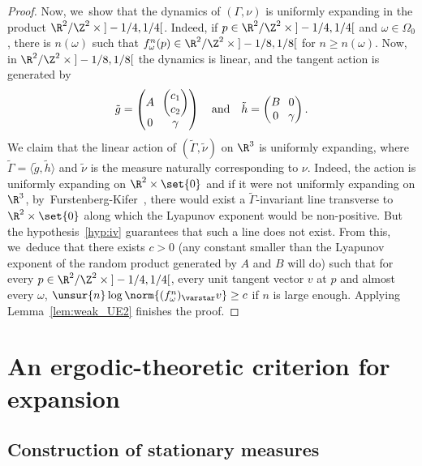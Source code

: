 \begin{proof}
Now, we~show that the dynamics of $(\Gamma, \nu)$ is uniformly expanding in the product
$\R^2/\Z^2 \times{}]-1/4, 1/4[$. Indeed, if $p\in \R^2/\Z^2 \times{}]-1/4, 1/4[$ and $\omega\in \Omega_0$, there
is $n(\omega)$ such that $f^n_\omega(p)\in \R^2/\Z^2 \times{}]-1/8, 1/8[$ for $n\geq n(\omega)$.
Now, in $\R^2/\Z^2 \times{}]-1/8, 1/8[$ the dynamics is linear, and the tangent action is generated by
\begin{equation*}\arraycolsep3.5pt
\tilde g = \begin{pmatrix}A & \begin{pmatrix} c_1 \\ c_2 \end{pmatrix} \\ 0 & \gamma
\end{pmatrix}
\quad\text{and}\quad
\tilde h = \begin{pmatrix}B& 0 \\ 0 & \gamma
\end{pmatrix}.
\end{equation*}
We claim that the linear action of $(\tilde \Gamma, \tilde \nu)$ on $\R^3$ is uniformly expanding,
where $\tilde \Gamma = \langle{\tilde g, \tilde h}\rangle$ and $\tilde \nu$ is the measure naturally
corresponding to $\nu$. Indeed, the action is uniformly expanding on $\R^2\times \set{0}$ and
if it were not uniformly expanding on $\R^3$, by~Furstenberg-Kifer~\cite{furstenberg-kifer},
there would exist a $\tilde \Gamma$-invariant line transverse to $\R^2\times \set{0}$ along which the Lyapunov exponent would be non-positive. But the hypothesis~\eqref{hyp:iv} guarantees that such a line does not exist.
From this, we~deduce that there exists $c>0$ (any constant smaller than the Lyapunov exponent
of the random product generated by $A$ and $B$ will do)
such that
for every $p \in \R^2/\Z^2 \times{}]-1/4, 1/4[$, every unit tangent vector $v$ at $p$
and almost every $\omega$, $\unsur{n} \log \norm{(f_\omega^n)_\varstar v}\geq c$ if $n$ is large enough.
Applying Lemma~\ref{lem:weak_UE2} finishes the proof.
\end{proof}

\section{An ergodic-theoretic criterion for expansion}\label{sec:criterion}

\subsection{Construction of stationary measures}
\label{subs:stationary}

